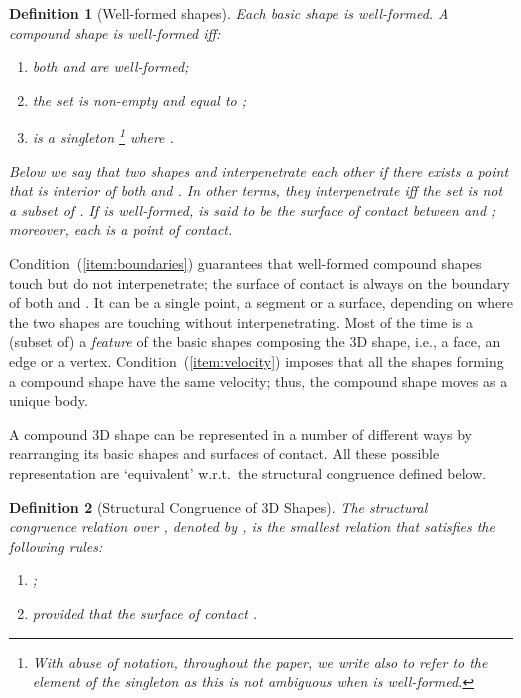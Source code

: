 \documentclass[11pt]{article}
\newtheorem{definition}{Definition}
\begin{document}
\begin{definition}[Well-formed shapes]
\label{def:shapeswf}
Each basic shape  is well-formed. A compound shape  is well-formed
iff:
\begin{enumerate}
\item both  and  are well-formed;
\item \label{item:boundaries} the set  is {\em non-empty} and
equal to ;
\item \label{item:velocity}  is a singleton \footnote{With abuse of notation, throughout the paper, we write  also to refer to the element  of the singleton   as this is not ambiguous when  is
well-formed.} where .
\end{enumerate}

\noindent Below we say that two shapes  and  {\em interpenetrate} each other if there exists a point  that is interior of both  and . In other terms, they interpenetrate iff the set  is not a subset of . If  is well-formed,  is said to be the {\em surface of contact} between  and ; moreover, each   is a {\em point of contact}.
\end{definition}

Condition~(\ref{item:boundaries}) guarantees that well-formed compound shapes touch but do not
interpenetrate; the surface of contact  is always on the boundary of both  and . It
can be a single point, a segment or a surface, depending on where the two shapes are touching
without interpenetrating. Most of the time  is a (subset of) a \emph{feature} of the
basic shapes composing the 3D shape, i.e., a face, an edge or a vertex.
Condition~(\ref{item:velocity}) imposes that all the shapes forming a compound shape have the same
velocity; thus, the compound shape moves as a unique body.

A compound 3D shape  can be represented in a number of different ways by rearranging its basic
shapes and surfaces of contact. All these possible representation are `equivalent' w.r.t.\  the
structural congruence defined below.

\begin{definition}[Structural Congruence of 3D Shapes]
\label{def:shapecongruence}
The structural \\ congruence relation over , denoted by , is the smallest relation that satisfies the following rules:
\begin{enumerate}
\item ;
\item  provided that
the surface of contact .
\end{enumerate}
\end{definition}
\end{document}
